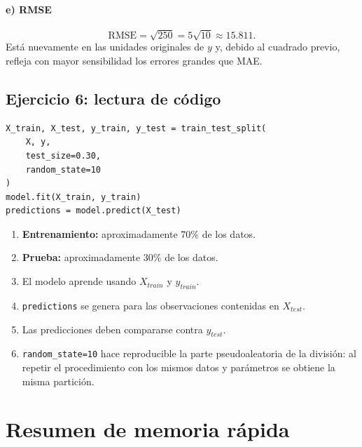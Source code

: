 \documentclass[11pt]{article}
\begin{document}
\paragraph{e) RMSE}
\[
\mathrm{RMSE}=\sqrt{250}=5\sqrt{10}\approx15.811.
\]
Está nuevamente en las unidades originales de $y$ y, debido al cuadrado previo, refleja con mayor sensibilidad los errores grandes que MAE.

\subsection{Ejercicio 6: lectura de código}
\begin{lstlisting}
X_train, X_test, y_train, y_test = train_test_split(
    X, y,
    test_size=0.30,
    random_state=10
)
model.fit(X_train, y_train)
predictions = model.predict(X_test)
\end{lstlisting}

\begin{enumerate}[label=\alph*)]
\item \textbf{Entrenamiento:} aproximadamente 70\% de los datos.
\item \textbf{Prueba:} aproximadamente 30\% de los datos.
\item El modelo aprende usando $X_{train}$ y $y_{train}$.
\item \texttt{predictions} se genera para las observaciones contenidas en $X_{test}$.
\item Las predicciones deben compararse contra $y_{test}$.
\item \texttt{random\_state=10} hace reproducible la parte pseudoaleatoria de la división: al repetir el procedimiento con los mismos datos y parámetros se obtiene la misma partición.
\end{enumerate}

\newpage
\section{Resumen de memoria rápida}
\end{document}
